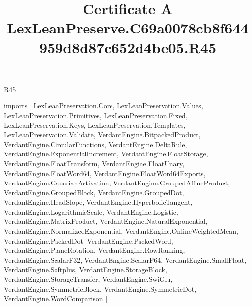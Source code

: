 \begin{lexlean}{R45}
\title{Certificate A LexLeanPreserve.C69a0078cb8f644959d8d87c652d4be05.R45}
\begin{coremodule}
imports [
  LexLeanPreservation.Core,
  LexLeanPreservation.Values,
  LexLeanPreservation.Primitives,
  LexLeanPreservation.Fixed,
  LexLeanPreservation.Keys,
  LexLeanPreservation.Templates,
  LexLeanPreservation.Validate,
  VerdantEngine.BitpackedProduct,
  VerdantEngine.CircularFunctions,
  VerdantEngine.DeltaRule,
  VerdantEngine.ExponentialIncrement,
  VerdantEngine.FloatStorage,
  VerdantEngine.FloatTransform,
  VerdantEngine.FloatUnary,
  VerdantEngine.FloatWord64,
  VerdantEngine.FloatWord64Exports,
  VerdantEngine.GaussianActivation,
  VerdantEngine.GroupedAffineProduct,
  VerdantEngine.GroupedBlock,
  VerdantEngine.GroupedDot,
  VerdantEngine.HeadSlope,
  VerdantEngine.HyperbolicTangent,
  VerdantEngine.LogarithmicScale,
  VerdantEngine.Logistic,
  VerdantEngine.MatrixProduct,
  VerdantEngine.NaturalExponential,
  VerdantEngine.NormalizedExponential,
  VerdantEngine.OnlineWeightedMean,
  VerdantEngine.PackedDot,
  VerdantEngine.PackedWord,
  VerdantEngine.PlaneRotation,
  VerdantEngine.RowRanking,
  VerdantEngine.ScalarF32,
  VerdantEngine.ScalarF64,
  VerdantEngine.SmallFloat,
  VerdantEngine.Softplus,
  VerdantEngine.StorageBlock,
  VerdantEngine.StorageTransfer,
  VerdantEngine.SwiGlu,
  VerdantEngine.SymmetricBlock,
  VerdantEngine.SymmetricDot,
  VerdantEngine.WordComparison
]


\end{coremodule}
\end{lexlean}

